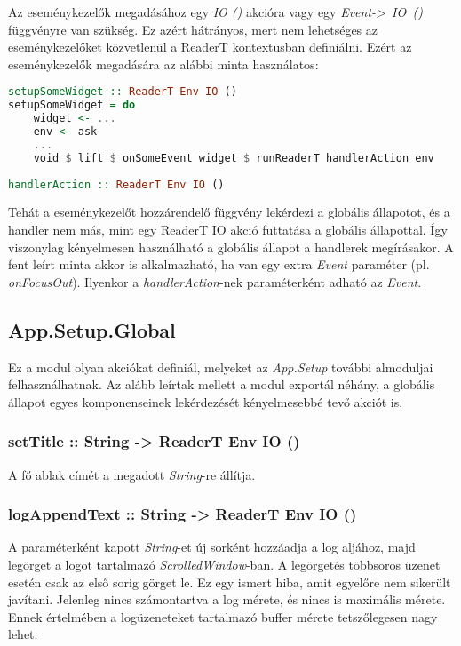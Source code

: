 Az eseménykezelők megadásához egy \textit{IO ()} akcióra vagy egy \mbox{\textit{Event-> IO ()}} függvényre van szükség. Ez azért hátrányos, mert nem lehetséges az eseménykezelőket közvetlenül a ReaderT kontextusban definiálni. Ezért az eseménykezelők megadására az alábbi minta használatos:

\begin{lstlisting}[language={Haskell}]
setupSomeWidget :: ReaderT Env IO ()
setupSomeWidget = do
	widget <- ...
	env <- ask
	...
	void $ lift $ onSomeEvent widget $ runReaderT handlerAction env
	
handlerAction :: ReaderT Env IO ()
\end{lstlisting}

Tehát a eseménykezelőt hozzárendelő függvény lekérdezi a globális állapotot, és a handler nem más, mint egy ReaderT IO akció futtatása a globális állapottal. Így viszonylag kényelmesen használható a globális állapot a handlerek megírásakor. A fent leírt minta akkor is alkalmazható, ha van egy extra \textit{Event} paraméter (pl. \textit{onFocusOut}).  Ilyenkor a \textit{handlerAction}-nek paraméterként adható az \textit{Event}.

\subsection{App.Setup.Global}

Ez a modul olyan akciókat definiál, melyeket az \textit{App.Setup} további almoduljai felhasználhatnak. Az alább leírtak mellett a modul exportál néhány, a globális állapot egyes komponenseinek lekérdezését kényelmesebbé tevő akciót is.

\subsubsection{setTitle :: String -> ReaderT Env IO ()}

A fő ablak címét a megadott \textit{String}-re állítja.

\subsubsection{logAppendText :: String -> ReaderT Env IO ()}

A paraméterként kapott \textit{String}-et új sorként hozzáadja a log aljához, majd legörget a logot tartalmazó \textit{ScrolledWindow}-ban. A legörgetés többsoros üzenet esetén csak az első sorig görget le. Ez egy ismert hiba, amit egyelőre nem sikerült javítani. Jelenleg nincs számontartva a log mérete, és nincs is maximális mérete. Ennek értelmében a logüzeneteket tartalmazó buffer mérete tetszőlegesen nagy lehet.

